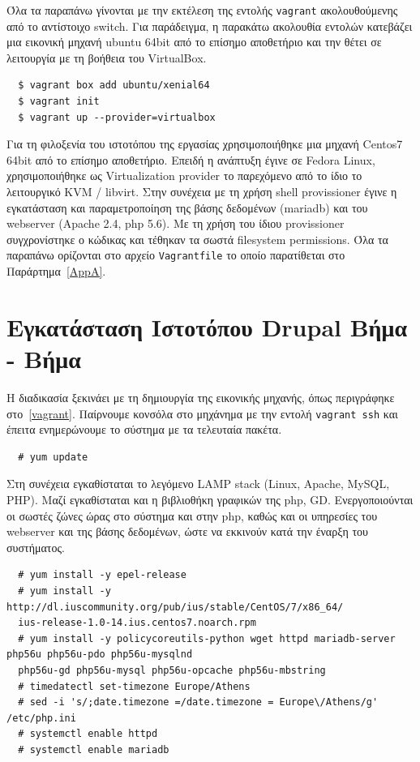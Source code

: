 \documentclass[12pt]{report}
\begin{document}
Όλα τα παραπάνω γίνονται με την εκτέλεση της εντολής \textlatin{\texttt{vagrant}} ακολουθούμενης από το αντίστοιχο \textlatin{switch}. Για παράδειγμα, η παρακάτω ακολουθία εντολών κατεβάζει μια εικονική μηχανή \textlatin{ubuntu 64bit} από το επίσημο αποθετήριο και την θέτει σε λειτουργία με τη βοήθεια του \textlatin{VirtualBox}.
\scriptsize
\begin{verbatim}
  $ vagrant box add ubuntu/xenial64
  $ vagrant init
  $ vagrant up --provider=virtualbox
\end{verbatim}
\normalsize
{}

Για τη φιλοξενία του ιστοτόπου της εργασίας χρησιμοποιήθηκε μια μηχανή \textlatin{Centos7 64bit} από το επίσημο αποθετήριο. Επειδή η ανάπτυξη έγινε σε \textlatin{Fedora Linux}, χρησιμοποιήθηκε ως \textlatin{Virtualization provider} το παρεχόμενο από το ίδιο το λειτουργικό \textlatin{KVM / libvirt}. Στην συνέχεια με τη χρήση \textlatin{shell provissioner} έγινε η εγκατάσταση και παραμετροποίηση της βάσης δεδομένων (\textlatin{mariadb}) και του \textlatin{webserver (Apache 2.4, php 5.6)}. Με τη χρήση του ίδιου \textlatin{provissioner} συγχρονίστηκε ο κώδικας και τέθηκαν τα σωστά \textlatin{filesystem permissions}.
Όλα τα παραπάνω ορίζονται στο αρχείο \textlatin{\texttt{Vagrantfile}} το οποίο παρατίθεται στο Παράρτημα~\ref{AppA}.

\section{Εγκατάσταση Ιστοτόπου \textlatin{Drupal} Βήμα - Βήμα}\label{manual_setup}
Η διαδικασία ξεκινάει με τη δημιουργία της εικονικής μηχανής, όπως περιγράφηκε στο~\ref{vagrant}. Παίρνουμε κονσόλα στο μηχάνημα με την εντολή \textlatin{\texttt{vagrant ssh}} και έπειτα ενημερώνουμε το σύστημα με τα τελευταία πακέτα.
\scriptsize
\begin{verbatim}
  # yum update
\end{verbatim}
\normalsize
{}

Στη συνέχεια εγκαθίσταται το λεγόμενο \textlatin{LAMP stack (Linux, Apache, MySQL, PHP)}. Μαζί εγκαθίσταται και η βιβλιοθήκη γραφικών της \textlatin{php, GD}. Ενεργοποιούνται οι σωστές ζώνες ώρας στο σύστημα και στην \textlatin{php}, καθώς και οι υπηρεσίες του \textlatin{webserver} και της βάσης δεδομένων, ώστε να εκκινούν κατά την έναρξη του συστήματος.
\scriptsize
\begin{verbatim}
  # yum install -y epel-release
  # yum install -y http://dl.iuscommunity.org/pub/ius/stable/CentOS/7/x86_64/
  ius-release-1.0-14.ius.centos7.noarch.rpm
  # yum install -y policycoreutils-python wget httpd mariadb-server php56u php56u-pdo php56u-mysqlnd
  php56u-gd php56u-mysql php56u-opcache php56u-mbstring
  # timedatectl set-timezone Europe/Athens
  # sed -i 's/;date.timezone =/date.timezone = Europe\/Athens/g' /etc/php.ini
  # systemctl enable httpd
  # systemctl enable mariadb
\end{verbatim}
\normalsize
{}
\end{document}
